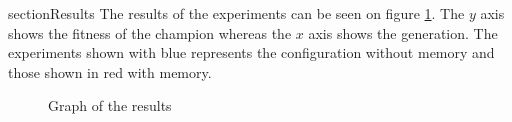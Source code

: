 
section{Results}
The results of the experiments can be seen on figure \ref{experiments:graph:1}. The $ y $ axis shows the fitness of the champion whereas the $ x $ axis shows the generation. The experiments shown with blue represents the configuration without memory and those shown in red with memory. 

\begin{figure}[ht]
	\caption{Graph of the results}
	\label{experiments:graph:1}
\end{figure}